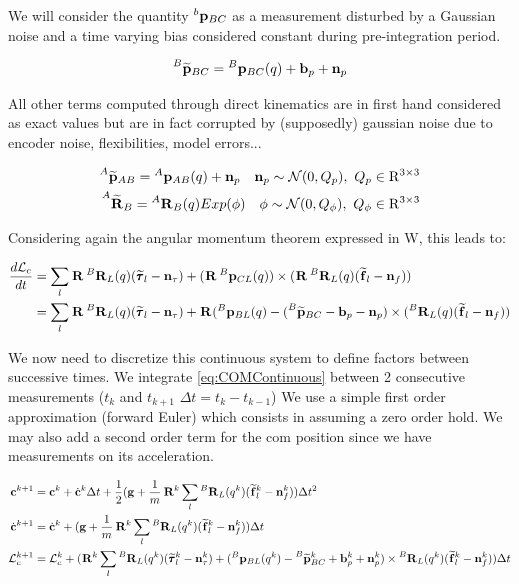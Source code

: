\documentclass[11pt]{article}
\newcommand{\Rot}[2]{\prescript{#1}{}{\bfR}_{#2}}
\newcommand{\Rotm}[2]{\prescript{#1}{}{\widetilde{\bfR}}_{#2}}
\newcommand{\noise}{\bfn}
\newcommand{\posi}[2]{\prescript{#1}{}{\bfp}_{#2}}
\newcommand{\posim}[2]{\prescript{#1}{}{\widetilde{\bfp}}_{#2}}
\newcommand{\forcem}[2]{\prescript{#1}{}{\widetilde{\bff}}_{#2}}
\newcommand{\torquem}[2]{\prescript{#1}{}{\widetilde{\pmb{\tau}}}_{#2}}
\newcommand{\AM}{\mathcal{L}}
\newcommand{\COM}{\bfc}
\newcommand{\Gaussian}[2]{\mathcal{N}({#1},{#2})}
\begin{document}
We will consider the quantity $\posi{b}{BC}$  as a measurement disturbed by a Gaussian noise and a time varying bias considered constant during pre-integration period. 
 
\begin{equation}
\posim{B}{BC} = \posi{B}{BC}(q) + \bfb_{p} + \noise_p 
\end{equation}

All other terms computed through direct kinematics are in first hand considered as exact values but are in fact corrupted by (supposedly) gaussian noise due to encoder noise, flexibilities, model errors...

\begin{equation}
\begin{split}
\posim{A}{AB} = \posi{A}{AB}(q) + \noise_p ~~~ \noise_p \sim \Gaussian{0}{Q_p}, ~ Q_p \in \mathrm{R}^{3\times 3} 
\\
\Rotm{A}{B} = \Rot{A}{B}(q) Exp(\phi) ~~~ \phi \sim \Gaussian{0}{Q_{\phi}}, ~ Q_{\phi} \in \mathrm{R}^{3\times 3}
\end{split}
\end{equation}
 
Considering again the angular momentum theorem expressed in W, this leads to:
 
\begin{equation}
\begin{split}
    \frac{d\AM_c}{dt} &= \sum_l \Rot{}{}\Rot{B}{L}(q)(\torquem{}{l} - \noise_{\tau}) + (\Rot{}{} \posi{B}{CL}(q)) \times (\Rot{}{}\Rot{B}{L}(q)(\forcem{}{l} - \noise_f))
\\
&= \sum_l \Rot{}{}\Rot{B}{L}(q)(\torquem{}{l} - \noise_{\tau}) + \Rot{}{}( \posi{B}{BL}(q) - (\posim{B}{BC} -  \bfb_{p} - \noise_p) \times (\Rot{B}{L}(q)(\forcem{}{l} - \noise_f))
\end{split}
\end{equation}


We now need to discretize this continuous system to define factors between successive times. We integrate \ref{eq:COMContinuous} between 2 consecutive measurements ($t_k$ and $t_{k+1}$ $\Delta t = t_{k} - t_{k-1}$)  We use a simple first order approximation (forward Euler) which consists in assuming a zero order hold. We may also add a second order term for the com position since we have measurements on its acceleration.

\begin{equation}
\begin{split}
\COM^{k+1} &= \COM^{k} + \dot{\COM}^{k} \Delta t 
+ \dfrac{1}{2}(\bfg + \frac{1}{m} \Rot{}{}^{k} \sum_l \Rot{B}{L}(q^{k}) (\forcem{}{l}^{k} - \noise_f^{k})) \Delta t^2
\\
\dot{\COM}^{k+1}&= \dot{\COM}^{k} + (\bfg + \frac{1}{m} \Rot{}{}^{k} \sum_l \Rot{B}{L}(q^{k}) (\forcem{}{l}^{k} - \noise_f^{k})) \Delta t 
\\
\AM_c^{k+1} &= \AM_c^{k} +  ( 
\Rot{}{}^{k}\sum_l \Rot{B}{L}(q^{k})(\torquem{}{l}^{k} - \noise_{\tau}^{k}) + (\posi{B}{BL}(q^k) - \posim{B}{BC}^k + \bfb_{p}^k + \noise_p^k) \times \Rot{B}{L}(q^{k})(\forcem{}{l}^{k} - \noise_f^{k}) 
) \Delta t
\end{split}
\label{eq:COMDiscrete}
\end{equation}
\end{document}
